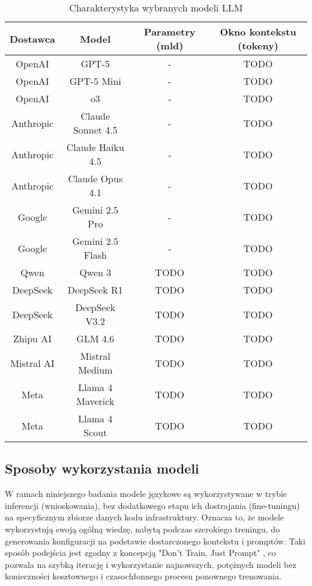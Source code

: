 \begin{table}[!h] \centering
\caption{Charakterystyka wybranych modeli LLM}
\label{tab:llm-characteristic}
\begin{tabular}{| c | c | c | c |} \hline
\textbf{Dostawca} & \textbf{Model} & \textbf{Parametry (mld)} & \textbf{Okno kontekstu (tokeny)} \\ \hline\hline
OpenAI & GPT-5 & - & TODO \\ \hline
OpenAI & GPT-5 Mini & - & TODO \\ \hline
OpenAI & o3 & - & TODO \\ \hline
Anthropic & Claude Sonnet 4.5 & - & TODO \\ \hline
Anthropic & Claude Haiku 4.5 & - & TODO \\ \hline
Anthropic & Claude Opus 4.1 & - & TODO \\ \hline
Google & Gemini 2.5 Pro & - & TODO \\ \hline
Google & Gemini 2.5 Flash & - & TODO \\ \hline
Qwen & Qwen 3 & TODO & TODO \\ \hline
DeepSeek & DeepSeek R1 & TODO & TODO \\ \hline
DeepSeek & DeepSeek V3.2 & TODO & TODO \\ \hline
Zhipu AI & GLM 4.6 & TODO & TODO \\ \hline
Mistral AI & Mistral Medium & TODO & TODO \\ \hline
Meta & Llama 4 Maverick & TODO & TODO \\ \hline
Meta & Llama 4 Scout & TODO & TODO \\ \hline
\end{tabular}
\end{table}

\subsection{Sposoby wykorzystania modeli}

W ramach niniejszego badania modele językowe są wykorzystywane w trybie inferencji (wnioskowania), bez dodatkowego etapu ich dostrajania (fine-tuningu) na specyficznym zbiorze danych kodu infrastruktury. Oznacza to, że modele wykorzystują swoją ogólną wiedzę, nabytą podczas szerokiego treningu, do generowania konfiguracji na podstawie dostarczonego kontekstu i promptów. Taki sposób podejścia jest zgodny z koncepcją "Don't Train, Just Prompt" \cite{kratzke_dont_2024}, co pozwala na szybką iterację i wykorzystanie najnowszych, potężnych modeli bez konieczności kosztownego i czasochłonnego procesu ponownego trenowania.

